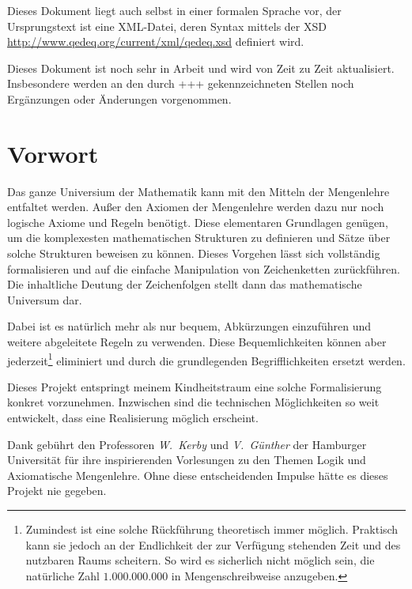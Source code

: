 \documentclass[a4paper,german,10pt,twoside]{book}
\theoremstyle{definition}
\theoremstyle{remark}
\begin{document}
\par
Dieses Dokument liegt auch selbst in einer formalen Sprache vor, der Ursprungstext ist eine XML-Datei, deren Syntax mittels der XSD \url{http://www.qedeq.org/current/xml/qedeq.xsd} definiert wird.

\par
Dieses Dokument ist noch sehr in Arbeit und wird von Zeit zu Zeit aktualisiert. Insbesondere werden an den durch {\glqq+++\grqq} gekennzeichneten Stellen noch Erg{\"a}nzungen oder {\"A}nderungen vorgenommen.


\chapter*{Vorwort} \label{chapter2} \hypertarget{chapter2}{}

Das ganze Universium der Mathematik kann mit den Mitteln der Mengenlehre entfaltet werden. Au{\ss}er den Axiomen der Mengenlehre werden dazu nur noch logische Axiome und Regeln ben{\"o}tigt. Diese elementaren Grundlagen gen{\"u}gen, um die komplexesten mathematischen Strukturen zu definieren und S{\"a}tze {\"u}ber solche Strukturen beweisen zu k{\"o}nnen. Dieses Vorgehen l{\"a}sst 
sich vollst{\"a}ndig formalisieren und auf die einfache Manipulation von Zeichenketten zur{\"u}ckf{\"u}hren. Die inhaltliche Deutung der Zeichenfolgen stellt dann das mathematische Universum dar.

\par
Dabei ist es nat{\"u}rlich mehr als nur bequem, Abk{\"u}rzungen einzuf{\"u}hren und weitere abgeleitete Regeln zu verwenden. Diese Bequemlichkeiten k{\"o}nnen aber jederzeit\footnote{Zumindest ist eine solche R{\"u}ckf{\"u}hrung theoretisch immer m{\"o}glich. Praktisch kann sie jedoch an der Endlichkeit der zur Verf{\"u}gung stehenden Zeit und des nutzbaren Raums scheitern. So wird es 
sicherlich nicht m{\"o}glich sein, die nat{\"u}rliche Zahl $1.000.000.000$ in Mengenschreibweise anzugeben.} eliminiert und durch die grundlegenden Begrifflichkeiten ersetzt werden.

\par
Dieses Projekt entspringt meinem Kindheitstraum eine solche Formalisierung konkret vorzunehmen. Inzwischen sind die technischen M{\"o}glichkeiten so weit entwickelt, dass eine Realisierung m{\"o}glich erscheint.

\par
Dank geb{\"u}hrt den Professoren \emph{W.~Kerby} und \emph{V.~G{\"u}nther} der Hamburger Universit{\"a}t f{\"u}r ihre inspirierenden Vorlesungen zu den Themen Logik und Axiomatische Mengenlehre. Ohne diese entscheidenden Impulse h{\"a}tte es dieses Projekt nie gegeben.
\end{document}
